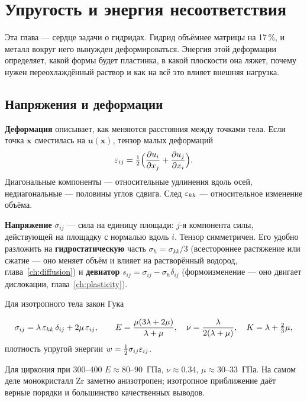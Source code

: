 \chapter{Упругость и энергия несоответствия}\label{ch:elastic}

Эта глава --- сердце задачи о гидридах. Гидрид объёмнее матрицы на 17\,\%, и металл вокруг него вынужден
деформироваться. Энергия этой деформации определяет, какой формы будет пластинка, в какой плоскости она ляжет,
почему нужен переохлаждённый раствор и как на всё это влияет внешняя нагрузка.

\section{Напряжения и деформации}

\textbf{Деформация} описывает, как меняются расстояния между точками тела. Если точка $\mathbf x$ сместилась на
$\mathbf u(\mathbf x)$, тензор малых деформаций
\begin{equation}
\varepsilon_{ij} = \tfrac12\Bigl(\frac{\partial u_i}{\partial x_j} + \frac{\partial u_j}{\partial x_i}\Bigr).
\end{equation}
Диагональные компоненты --- относительные удлинения вдоль осей, недиагональные --- половины углов сдвига.
След $\varepsilon_{kk}$ --- относительное изменение объёма.

\textbf{Напряжение} $\sigma_{ij}$ --- сила на единицу площади: $j$-я компонента силы, действующей на площадку с
нормалью вдоль $i$. Тензор симметричен. Его удобно разложить на \textbf{гидростатическую} часть
$\sigma_h = \sigma_{kk}/3$ (всестороннее растяжение или сжатие --- оно меняет объём и влияет на растворённый
водород, глава~\ref{ch:diffusion}) и \textbf{девиатор} $s_{ij} = \sigma_{ij} - \sigma_h\delta_{ij}$ (формоизменение --- оно
двигает дислокации, глава~\ref{ch:plasticity}).

Для изотропного тела закон Гука
\begin{keyf}
\[
\sigma_{ij} = \lambda\,\varepsilon_{kk}\,\delta_{ij} + 2\mu\,\varepsilon_{ij},\qquad
E = \frac{\mu(3\lambda+2\mu)}{\lambda+\mu},\quad \nu = \frac{\lambda}{2(\lambda+\mu)},\quad K = \lambda + \tfrac23\mu ,
\]
плотность упругой энергии $w = \tfrac12\sigma_{ij}\varepsilon_{ij}$.
\end{keyf}
Для циркония при 300--400\degC{} $E\approx 80$--$90$~ГПа, $\nu\approx0.34$, $\mu\approx30$--$33$~ГПа. На самом деле
монокристалл Zr заметно анизотропен; изотропное приближение даёт верные порядки и большинство качественных
выводов.

